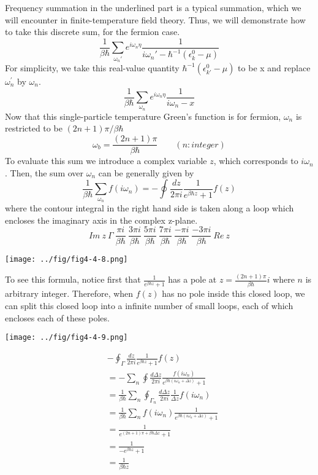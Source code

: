 Frequency summation in the underlined part is a typical summation, which we will encounter in finite-temperature field theory.
Thus, we will demonstrate how to take this discrete sum, for the fermion case.
\begin{equation}
\frac{1}{\beta\hbar} \sum_{\omega_n'} e^{i\omega_n\eta} \frac{1}{i\omega_n'-\hbar^{-1}(\epsilon_k^0-\mu)}
\end{equation}
For simplicity, we take this real-value quantity $\hbar^{-1}(\epsilon^{0}_{k'}-\mu)$ to be x and replace $\omega^{\prime}_n$ by $\omega_n$.
\[
\frac{1}{\beta\hbar}\sum_{\omega_n}e^{i\omega_n\eta} \frac{1}{i\omega_n-x} \tag{$4.4.21^\prime$}
\]
Now that this single-particle temperature Green's function is for fermion, $\omega_n$ is restricted to be $(2n+1)\pi/\beta\hbar$
\[
\omega_b=\frac{(2n+1)\pi}{\beta\hbar}\qquad(n:integer)
\]
To evaluate this sum we introduce a complex variable $z$, which corresponds to $i\omega_n$. Then, the sum over $\omega_n$ can be generally given by
\begin{equation}
\frac{1}{\beta\hbar}\sum_{\omega_n}f(i\omega_n)=-\oint\frac{dz}{2\pi i}\frac{1}{e^{\beta\hbar z}+1}f(z)
\end{equation}
where the contour integral in the right hand side is taken along a loop which encloses the imaginary axis in the complex z-plane.
\[
Im\ z\ \Gamma\ \frac{\pi i}{\beta\hbar}\ \frac{3\pi i}{\beta\hbar}\ \frac{5\pi i}{\beta\hbar}\ \frac{7\pi i}{\beta\hbar}\ \frac{-\pi i}{\beta\hbar}\ \frac{-3\pi i}{\beta\hbar}\ Re\ z
\]
\begin{center}
\texttt{[image: ../fig/fig4-4-8.png]}
\end{center}
To see this formula, notice first that $\frac{1}{e^{\beta\hbar z}+1}$ has a pole at $z=\frac{(2n+1)\pi}{\beta\hbar}i$ where $n$ is arbitrary integer.
Therefore, when $f(z)$ has no pole inside this closed loop, we can split this closed loop into a infinite number of small loops, each of which encloses each of these poles.
\begin{center}
\texttt{[image: ../fig/fig4-4-9.png]}
\end{center}
\[
\begin{aligned}
&-\oint_\Gamma \frac{dz}{2\pi i} \frac{1}{e^{\beta\hbar z}+1}f(z)\\
&=-\sum_n \oint \frac{d\Delta z}{2\pi i} \frac{f(i\omega_n)}{e^{\beta\hbar(i\omega_n+\Delta z)}+1}\\
&=\frac{1}{\beta\hbar} \sum_n \oint_{\Gamma_n} \frac{d\Delta z}{2\pi i} \frac{1}{\Delta z} f(i\omega_n)\\
&=\frac{1}{\beta\hbar}\sum_n f(i\omega_n) \frac{1}{e^{\beta\hbar(i\omega_n+\Delta z)}+1}\\
&=\frac{1}{e^{(2n+1)\pi+\beta\hbar\Delta z}+1}\\
&=\frac{1}{-e^{\beta\hbar z}+1}\\
&=\frac{1}{\beta\hbar z}
\end{aligned}
\]
